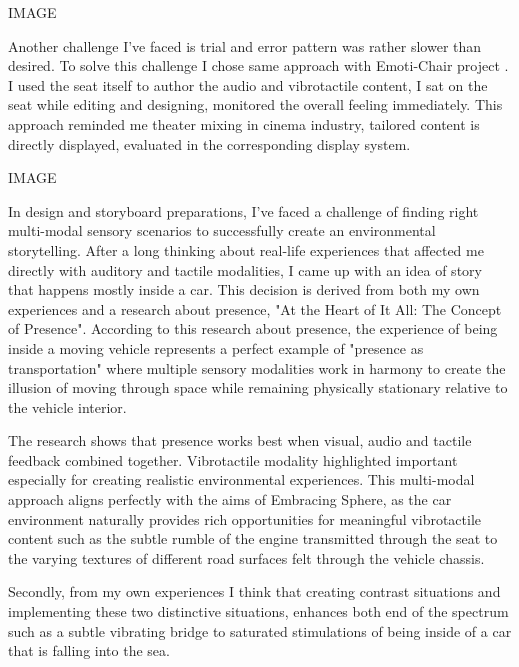         IMAGE

        Another challenge I've faced is trial and error pattern was rather slower than desired. To solve this challenge I chose same approach with Emoti-Chair project \cite{Composing_Vibrotactile_Music}. I used the seat itself to author the audio and vibrotactile content, I sat on the seat while editing and designing, monitored the overall feeling immediately. This approach reminded me theater mixing in cinema industry, tailored content is directly displayed, evaluated in the corresponding display system.\par

        IMAGE

        In design and storyboard preparations, I've faced a challenge of finding right multi-modal sensory scenarios to successfully create an environmental storytelling. After a long thinking about real-life experiences that affected me directly with auditory and tactile modalities, I came up with an idea of story that happens mostly inside a car. This decision is derived from both my own experiences and a research about presence, "At the Heart of It All: The Concept of Presence"\cite{Concept_of_Presence}. According to this research about presence, the experience of being inside a moving vehicle represents a perfect example of "presence as transportation" where multiple sensory modalities work in harmony to create the illusion of moving through space while remaining physically stationary relative to the vehicle interior.\par

        The research shows that presence works best when visual, audio and tactile feedback combined together. Vibrotactile modality highlighted important especially for creating realistic environmental experiences. This multi-modal approach aligns perfectly with the aims of Embracing Sphere, as the car environment naturally provides rich opportunities for meaningful vibrotactile content such as the subtle rumble of the engine transmitted through the seat to the varying textures of different road surfaces felt through the vehicle chassis.\par

        Secondly, from my own experiences I think that creating contrast situations and implementing these two distinctive situations, enhances both end of the spectrum such as a subtle vibrating bridge to saturated stimulations of being inside of a car that is falling into the sea.\par

